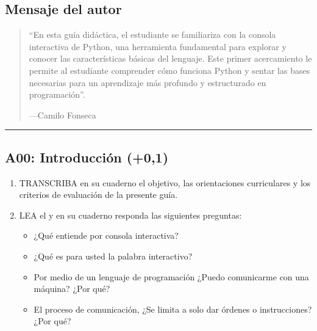 \documentclass[letterpaper,10pt,spanish]{sphinxmanual}
\begin{document}
\subsection{Mensaje del autor}
\label{\detokenize{1_guias/10programacion/G1024:mensaje-del-autor}}\begin{quote}

\sphinxAtStartPar
“En esta guía didáctica, el estudiante se familiariza con la consola interactiva de Python, una herramienta fundamental para explorar y conocer las características básicas del lenguaje. Este primer acercamiento le permite al estudiante comprender cómo funciona Python y sentar las bases necesarias para un aprendizaje más profundo y estructurado en programación”.

\begin{flushright}
---Camilo Fonseca
\end{flushright}
\end{quote}


\bigskip\hrule\bigskip



\subsection{A00: Introducción (+0,1)}
\label{\detokenize{1_guias/10programacion/G1024:a00-introduccion-0-1}}
\sphinxAtStartPar
{}
\begin{enumerate}
%
\item {} 
\sphinxAtStartPar
TRANSCRIBA en su cuaderno el objetivo, las orientaciones curriculares y los criterios de evaluación de la presente guía.

\item {} 
\sphinxAtStartPar
LEA el  y en su cuaderno responda las siguientes preguntas:
\begin{itemize}
\item {} 
\sphinxAtStartPar
¿Qué entiende por consola interactiva?

\item {} 
\sphinxAtStartPar
¿Qué es para usted la palabra interactivo?

\item {} 
\sphinxAtStartPar
Por medio de un lenguaje de programación ¿Puedo comunicarme con una máquina? ¿Por qué?

\item {} 
\sphinxAtStartPar
El proceso de comunicación, ¿Se limita a solo dar órdenes o instrucciones? ¿Por qué?

\end{itemize}

\end{enumerate}
\end{document}
